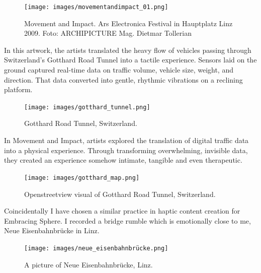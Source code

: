                 \begin{figure}[H]
                    \centering
                    \texttt{[image: images/movementandimpact\_01.png]}
                    \caption{Movement and Impact. Ars Electronica Festival in Hauptplatz Linz 2009. Foto: ARCHIPICTURE Mag. Dietmar Tollerian}
                    \label{fig:MOVNIMP}
                \end{figure}   

                In this artwork, the artists translated the heavy flow of vehicles passing through Switzerland's Gotthard Road Tunnel into a tactile experience. Sensors laid on the ground captured real-time data on traffic volume, vehicle size, weight, and direction. That data converted into gentle, rhythmic vibrations on a reclining platform\cite{Movement_and_Impact_ARS}.\par

                \begin{figure}[H]
                    \centering
                    \texttt{[image: images/gotthard\_tunnel.png]}
                    \caption{Gotthard Road Tunnel, Switzerland.}
                    \label{fig:GOTTHARD}
                \end{figure}  

                In Movement and Impact, artists explored the translation of digital traffic data into a physical experience. Through transforming overwhelming, invisible data, they created an experience somehow intimate, tangible and even therapeutic.\par

                \begin{figure}[H]
                    \centering
                    \texttt{[image: images/gotthard\_map.png]}
                    \caption{Openstreetview visual of Gotthard Road Tunnel, Switzerland.}
                    \label{fig:GOTTHARD_02}
                \end{figure}  

                Coincidentally I have chosen a similar practice in haptic content creation for Embracing Sphere. I recorded a bridge rumble which is emotionally close to me, Neue Eisenbahnbrücke in Linz.\par

                \begin{figure}[H]
                    \centering
                    \texttt{[image: images/neue\_eisenbahnbrücke.png]}
                    \caption{A picture of Neue Eisenbahnbrücke, Linz.}
                    \label{fig:BRUCKELINZ}
                \end{figure}

